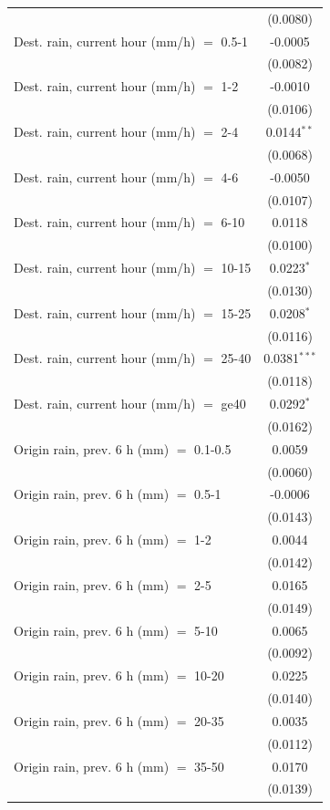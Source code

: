 \begin{tabular}{lc}
    & (0.0080)\\
   Dest. rain, current hour (mm/h) $=$ 0.5-1 & -0.0005\\
    & (0.0082)\\
   Dest. rain, current hour (mm/h) $=$ 1-2 & -0.0010\\
    & (0.0106)\\
   Dest. rain, current hour (mm/h) $=$ 2-4 & 0.0144$^{**}$\\
    & (0.0068)\\
   Dest. rain, current hour (mm/h) $=$ 4-6 & -0.0050\\
    & (0.0107)\\
   Dest. rain, current hour (mm/h) $=$ 6-10 & 0.0118\\
    & (0.0100)\\
   Dest. rain, current hour (mm/h) $=$ 10-15 & 0.0223$^{*}$\\
    & (0.0130)\\
   Dest. rain, current hour (mm/h) $=$ 15-25 & 0.0208$^{*}$\\
    & (0.0116)\\
   Dest. rain, current hour (mm/h) $=$ 25-40 & 0.0381$^{***}$\\
    & (0.0118)\\
   Dest. rain, current hour (mm/h) $=$ ge40 & 0.0292$^{*}$\\
    & (0.0162)\\
   Origin rain, prev. 6 h (mm) $=$ 0.1-0.5 & 0.0059\\
    & (0.0060)\\
   Origin rain, prev. 6 h (mm) $=$ 0.5-1 & -0.0006\\
    & (0.0143)\\
   Origin rain, prev. 6 h (mm) $=$ 1-2 & 0.0044\\
    & (0.0142)\\
   Origin rain, prev. 6 h (mm) $=$ 2-5 & 0.0165\\
    & (0.0149)\\
   Origin rain, prev. 6 h (mm) $=$ 5-10 & 0.0065\\
    & (0.0092)\\
   Origin rain, prev. 6 h (mm) $=$ 10-20 & 0.0225\\
    & (0.0140)\\
   Origin rain, prev. 6 h (mm) $=$ 20-35 & 0.0035\\
    & (0.0112)\\
   Origin rain, prev. 6 h (mm) $=$ 35-50 & 0.0170\\
    & (0.0139)\\

\end{tabular}
